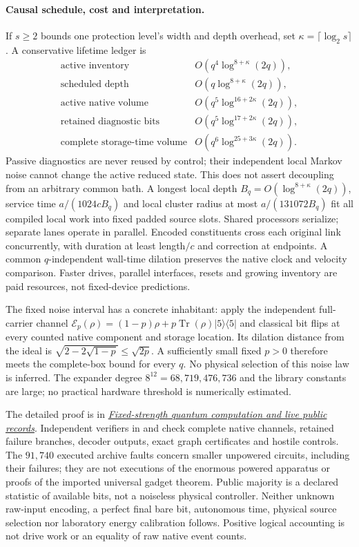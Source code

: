 \paragraph{Causal schedule, cost and interpretation.}
If $s\ge2$ bounds one protection level's width and depth overhead, set
$\kappa=\lceil\log_2s\rceil$. A conservative lifetime ledger is
\[
 \begin{array}{ll}
 \text{active inventory}&O(q^4\log^{8+\kappa}(2q)),\\
 \text{scheduled depth}&O(q\log^{8+\kappa}(2q)),\\
 \text{active native volume}&O(q^5\log^{16+2\kappa}(2q)),\\
 \text{retained diagnostic bits}&O(q^5\log^{17+2\kappa}(2q)),\\
 \text{complete storage-time volume}&O(q^6\log^{25+3\kappa}(2q)).
 \end{array}
\]
Passive diagnostics are never reused by control; their independent local
Markov noise cannot change the active reduced state. This does not assert
decoupling from an arbitrary common bath. A longest local depth
$B_q=O(\log^{8+\kappa}(2q))$, service time $a/(1024cB_q)$ and local
cluster radius at most $a/(131072B_q)$ fit all compiled local work into
fixed padded source slots. Shared processors serialize; separate lanes
operate in parallel. Encoded constituents cross each original link
concurrently, with duration at least length$/c$ and correction at endpoints.
A common $q$-independent wall-time dilation preserves the native clock and
velocity comparison. Faster drives, parallel interfaces, resets and growing
inventory are paid resources, not fixed-device predictions.

The fixed noise interval has a concrete inhabitant: apply the independent
full-carrier channel
$\mathcal E_p(\rho)=(1-p)\rho+p\operatorname{Tr}(\rho)|5\rangle\langle5|$
and classical bit flips at every counted native component and storage
location. Its dilation distance from the ideal is
$\sqrt{2-2\sqrt{1-p}}\le\sqrt{2p}$. A sufficiently small fixed $p>0$
therefore meets the complete-box bound for every $q$.
No physical selection of this noise law is inferred. The expander degree
$8^{12}=68{,}719{,}476{,}736$ and the library constants are large; no
practical hardware threshold is numerically estimated.

The detailed proof is in
\href{https://github.com/FloatingPragma/observer-patch-holography/blob/r2055/docs/research/FIXED_STRENGTH_PUBLIC_RECORDS.md}{\emph{Fixed-strength quantum computation and live public records}}.
Independent verifiers in  and
 check complete native channels, retained
failure branches, decoder outputs, exact graph certificates and hostile
controls. The $91{,}740$ executed archive faults concern smaller unpowered
circuits, including their failures; they are not executions of the enormous
powered apparatus or proofs of the imported universal gadget theorem.
Public majority is a declared statistic of available bits, not a noiseless
physical controller. Neither unknown raw-input encoding, a perfect final
bare bit, autonomous time, physical source selection nor laboratory energy
calibration follows. Positive logical accounting is not drive work or an
equality of raw native event counts.
